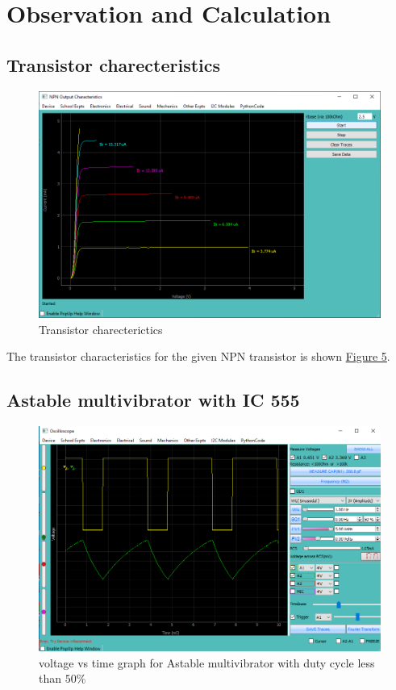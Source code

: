\section{Observation and Calculation}
	\subsection{Transistor charecteristics}
		\begin{figure}[h]
			\centering
			\includegraphics[width=0.8\columnwidth]{images/tc.png}
			\caption{Transistor charecterictics}
			\label{ss:1}
		\end{figure}
		The transistor characteristics for the given NPN transistor is shown \hyperref[ss:1]{Figure 5}.

	\subsection{Astable multivibrator with IC 555}
		\begin{figure}[h]
			\centering
			\includegraphics[width=0.8\columnwidth]{images/dc100.png}
			\caption{voltage vs time graph for Astable multivibrator with duty cycle less than $50\%$}
			\label{ss:2}
		\end{figure}

